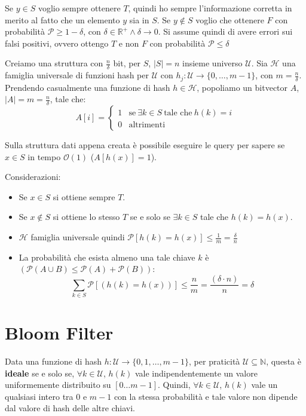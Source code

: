 Se $y \in S$ voglio sempre ottenere $T$, quindi ho sempre l'informazione corretta
in merito al fatto che un elemento $y$ sia in $S$. Se $y \notin S$ voglio che
ottenere $F$ con probabilità $\mathcal{P} \geq 1 - \delta$, con
$\delta \in \mathbb{R}^{+} \land \delta \to 0$. Si assume quindi di avere errori
sui falsi positivi, ovvero ottengo $T$ e non $F$ con probabilità $\mathcal{P} \leq \delta$

Creiamo una struttura con $\frac{n}{\delta}$ bit, per $S$, $|S| = n$ insieme
universo $\mathcal{U}$. Sia $\mathcal{H}$ una famiglia universale di funzioni hash
per $\mathcal{U}$ con $h_j : \mathcal{U} \to \{0, \dots, m - 1\}$, con $m = \frac{n}{\delta}$.
Prendendo casualmente una funzione di hash $h \in \mathcal{H}$, popoliamo un
bitvector $A$, $|A| = m = \frac{n}{\delta}$, tale che:
\begin{equation}
    A[i] = \begin{cases}
        1 & \text{se} \ \exists k \in S \ \text{tale che} \ h(k) = i \\
        0 & \text{altrimenti}
    \end{cases}
\end{equation}

Sulla struttura dati appena creata è possibile eseguire le query per sapere se
$x \in S$ in tempo $\mathcal{O}(1)$ ($A[h(x)] = 1$).

Considerazioni:
\begin{itemize}
    \item Se $x \in S$ si ottiene sempre $T$.
    \item Se $x \notin S$ si ottiene lo stesso $T$ se e solo se $\exists k \in S$
          tale che $h(k) = h(x)$.
    \item $\mathcal{H}$ famiglia universale quindi
          $\mathcal{P}[h(k) = h(x)] \leq \frac{1}{m} = \frac{\delta}{n}$
    \item La probabilità che esista almeno una tale chiave
          $k$ è $(\mathcal{P}(A \cup B) \leq \mathcal{P}(A) + \mathcal{P}(B))$:
          \begin{equation}
              \sum_{k \in S} \mathcal{P}[(h(k) = h(x))] \leq \frac{n}{m} = \frac{(\delta \cdot n)}{n} = \delta
          \end{equation}
\end{itemize}
\section{Bloom Filter}
\begin{definizione} 
    Data una funzione di hash $h : \mathcal{U} \to \{0, 1, \dots, m - 1\}$, per
    praticità $\mathcal{U} \subseteq \mathbb{N}$, questa è \textbf{ideale} se e
    solo se, $\forall k \in \mathcal{U}$, $h(k)$ vale indipendentemente un valore
    uniformemente distribuito su $[0 \dots m - 1]$. Quindi, $\forall k \in \mathcal{U}$, $h(k)$
    vale un qualsiasi intero tra $0$ e $m - 1$ con la stessa probabilità e tale
    valore non dipende dal valore di hash delle altre chiavi.
\end{definizione}

